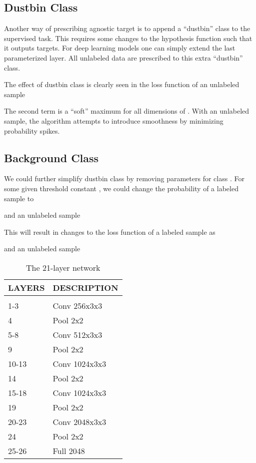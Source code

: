 \documentclass[letterpaper]{article}
\begin{document}
\subsection{Dustbin Class}
\label{sect:dust}

Another way of prescribing agnostic target is to append a ``dustbin'' class to the supervised task. This requires some changes to the hypothesis function  such that it outputs  targets. For deep learning models one can simply extend the last parameterized layer. All unlabeled data are prescribed to this extra ``dustbin'' class.

The effect of dustbin class is clearly seen in the loss function of an unlabeled sample 

The second term is a ``soft'' maximum for all dimensions of . With an unlabeled sample, the algorithm attempts to introduce smoothness by minimizing probability spikes.

\subsection{Background Class}
\label{sect:bgnd}

We could further simplify dustbin class by removing parameters for class . For some given threshold constant , we could change the probability of a labeled sample to

and an unlabeled sample


This will result in changes to the loss function of a labeled sample  as

and an unlabeled sample


\begin{table}[h]
  \caption{The 21-layer network}
  \label{tab:expi}
  \begin{center}
    \begin{tabular}{ll}
      \multicolumn{1}{c}{\bf LAYERS}  &\multicolumn{1}{c}{\bf DESCRIPTION}
      \\ \hline \\
      1-3           &Conv 256x3x3 \\
      4             &Pool 2x2 \\
      5-8           &Conv 512x3x3 \\
      9             &Pool 2x2 \\
      10-13         &Conv 1024x3x3 \\
      14            &Pool 2x2 \\
      15-18         &Conv 1024x3x3 \\
      19            &Pool 2x2 \\
      20-23         &Conv 2048x3x3 \\
      24            &Pool 2x2 \\
      25-26         &Full 2048 \\
    \end{tabular}
  \end{center}
\end{table}
\end{document}
